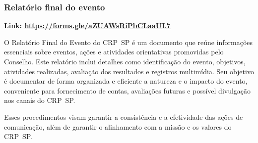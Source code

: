 \subsubsection{Relatório final do
  evento}

\textbf{Link:
  \href{https://forms.gle/aZUAWsRiPbCLaaUL7}{https://forms.gle/aZUAWsRiPbCLaaUL7}}

O Relatório Final do Evento do CRP~SP é um documento que reúne
informações essenciais sobre eventos, ações e atividades orientativas
promovidas pelo Conselho. Este relatório inclui detalhes como
identificação do evento, objetivos, atividades realizadas, avaliação dos
resultados e registros multimídia. Seu objetivo é documentar de forma
organizada e eficiente a natureza e o impacto do evento, conveniente
para fornecimento de contas, avaliações futuras e possível divulgação
nos canais do CRP~SP.

Esses procedimentos visam garantir a consistência e a efetividade das
ações de comunicação, além de garantir o alinhamento com a missão e os
valores do CRP~SP.